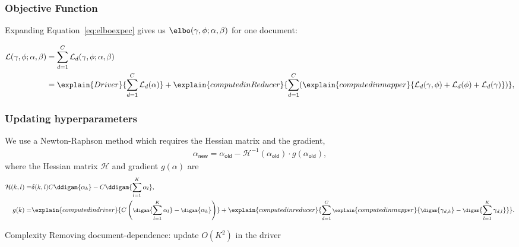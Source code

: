 \begin{frame}

\frametitle{Objective Function}

Expanding Equation~\ref{eq:elboexpec} gives us
$\elbo(\gamma, \phi; \alpha, \beta)$ for one document:
\begin{scriptsize}
\begin{align*}
\mathcal{L}(\gamma, \phi; \alpha, \beta) & = \sum_{d=1}^C \mathcal{L}_d(\gamma, \phi; \alpha, \beta)\\
& = \explain{Driver}{\sum_{d=1}^C \mathcal{L}_d(\alpha)} + \explain{computed in Reducer}{\sum_{d=1}^C (\explain{computed in mapper}{\mathcal{L}_d(\gamma, \phi)  + \mathcal{L}_d(\phi) + \mathcal{L}_d(\gamma)})},
\end{align*}
\end{scriptsize}
\end{frame}

\begin{frame}
	\frametitle{Updating hyperparameters}

We use a
Newton-Raphson method which requires the Hessian matrix and the gradient,
\begin{align*}
\alpha_{\mathsf{new}} = \alpha_{\mathsf{old}} - \mathcal{H}^{-1}(\alpha_{\mathsf{old}}) \cdot g(\alpha_{\mathsf{old}}),
\end{align*}
\pause
where the Hessian matrix $\mathcal{H}$ and gradient $g(\alpha)$ are
\begin{align*}
\mathcal{H}(k, l)  = & \delta(k, l) C \ddigam{\alpha_k} - C
\ddigam{\sum_{l=1}^K \alpha_l}, \\
g(k)  = &\explain{\footnotesize{computed in driver}}{C \left( \digam{
      \displaystyle \sum_{l=1}^K \alpha_l} -
  \digam{\alpha_k} \right) } + \explain{\footnotesize{computed in reducer}}{ \displaystyle \sum_{d=1}^C
  \explain{\footnotesize{computed in mapper}}{\digam{\gamma_{d, k}} -
    \digam{ \displaystyle \sum_{l=1}^K \gamma_{d, l}}} }.
\end{align*}

\begin{block}{Complexity}
	Removing document-dependence: update $O(K^2)$ in the driver
\end{block}

\end{frame}

